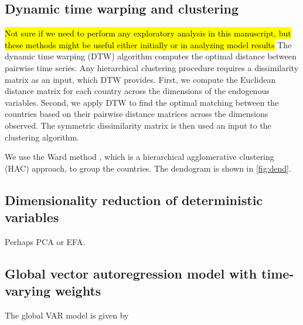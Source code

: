 \documentclass[preprint, 12pt]{elsarticle}
\newcommand{\?}{\stackrel{?}{=}}
\begin{document}
\subsection{Dynamic time warping and clustering}
\hl{Not sure if we need to perform any exploratory analysis in this manuscript, but these methods might be useful either initially or in analyzing model results}
The dynamic time warping (DTW) algorithm \cite{giorgino2009computing} computes the optimal distance between pairwise time series.
Any hierarchical clustering procedure requires a dissimilarity matrix as an input, which DTW provides.
First, we compute the Euclidean distance matrix for each country across the dimensions of the endogenous variables.
Second, we apply DTW to find the optimal matching between the countries based on their pairwise distance matrices across the dimensions observed.
The symmetric dissimilarity matrix is then used an input to the clustering algorithm.

We use the Ward method \cite{murtagh2014ward}, which is a hierarchical agglomerative clustering (HAC) approach, to group the countries.
The dendogram is shown in \autoref{fig:dend}.

\subsection{Dimensionality reduction of deterministic variables}
Perhaps PCA or EFA.

\subsection{Global vector autoregression model with time-varying weights}
The global VAR model \cite{dees2007exploring} is given by
\end{document}
